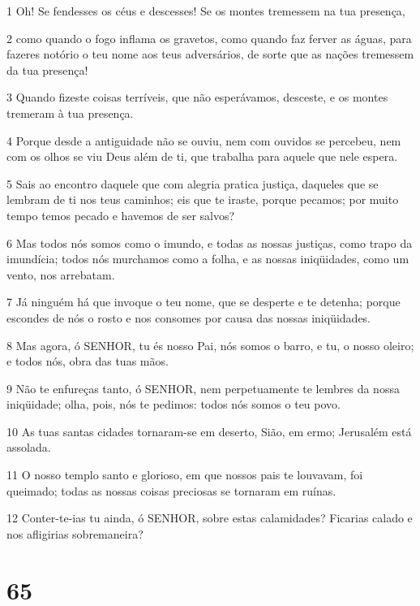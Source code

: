 \par 1 Oh! Se fendesses os céus e descesses! Se os montes tremessem na tua presença,
\par 2 como quando o fogo inflama os gravetos, como quando faz ferver as águas, para fazeres notório o teu nome aos teus adversários, de sorte que as nações tremessem da tua presença!
\par 3 Quando fizeste coisas terríveis, que não esperávamos, desceste, e os montes tremeram à tua presença.
\par 4 Porque desde a antiguidade não se ouviu, nem com ouvidos se percebeu, nem com os olhos se viu Deus além de ti, que trabalha para aquele que nele espera.
\par 5 Sais ao encontro daquele que com alegria pratica justiça, daqueles que se lembram de ti nos teus caminhos; eis que te iraste, porque pecamos; por muito tempo temos pecado e havemos de ser salvos?
\par 6 Mas todos nós somos como o imundo, e todas as nossas justiças, como trapo da imundícia; todos nós murchamos como a folha, e as nossas iniqüidades, como um vento, nos arrebatam.
\par 7 Já ninguém há que invoque o teu nome, que se desperte e te detenha; porque escondes de nós o rosto e nos consomes por causa das nossas iniqüidades.
\par 8 Mas agora, ó SENHOR, tu és nosso Pai, nós somos o barro, e tu, o nosso oleiro; e todos nós, obra das tuas mãos.
\par 9 Não te enfureças tanto, ó SENHOR, nem perpetuamente te lembres da nossa iniqüidade; olha, pois, nós te pedimos: todos nós somos o teu povo.
\par 10 As tuas santas cidades tornaram-se em deserto, Sião, em ermo; Jerusalém está assolada.
\par 11 O nosso templo santo e glorioso, em que nossos pais te louvavam, foi queimado; todas as nossas coisas preciosas se tornaram em ruínas.
\par 12 Conter-te-ias tu ainda, ó SENHOR, sobre estas calamidades? Ficarias calado e nos afligirias sobremaneira?

\chapter{65}

